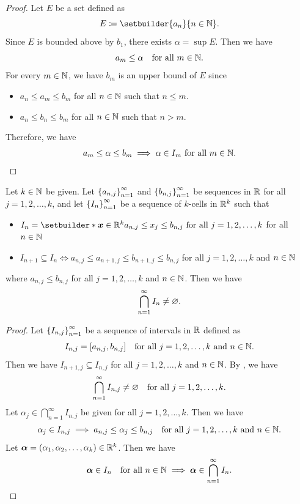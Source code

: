 \begin{proof}
    Let $E$ be a set defined as
    \[
    E \coloneqq \setbuilder{a_{n}}{n \in \N}.
    \]
    Since $E$ is bounded above by $b_{1}$, there exists $\alpha = \sup E$. Then we have
    \[
    a_{m} \leq \alpha \quad \text{for all } m \in \N.
    \]
    For every $m \in \N$, we have $b_{m}$ is an upper bound of $E$ since
    \begin{itemize}
        \item $a_{n} \leq a_{m} \leq b_{m}$ for all $n \in \N$ such that $n \leq m$.
        \item $a_{n} \leq b_{n} \leq b_{m}$ for all $n \in \N$ such that $n > m$.
    \end{itemize}
    Therefore, we have
    \[
    a_{m} \leq \alpha \leq b_{m} \implies \alpha \in I_{m} \text{ for all } m \in \N.
    \]
\end{proof}

\bigskip

\begin{theorem} \label{an:thm:nested-k-cells}
    Let $k \in \N$ be given. Let $\set*{a_{n, j}}_{n = 1}^{\infty}$ and $\set*{b_{n, j}}_{n = 1}^{\infty}$ be sequences
    in $\R$ for all $j = 1, 2, \dots, k$, and let $\set*{I_{n}}_{n = 1}^{\infty}$ be a sequence of $k$-cells in $\R^{k}$
    such that
    \begin{itemize}
        \item $I_{n} = \setbuilder*{\bm{x} \in \R^{k}}{a_{n, j} \leq x_{j} \leq b_{n, j}
        \text{ for all } j = 1, 2, \dots, k}$ for all $n \in \N$
        \item $I_{n + 1} \subseteq I_{n} \iff a_{n, j} \leq a_{n + 1, j} \leq b_{n + 1, j} \leq b_{n, j}$
        for all $j = 1, 2, \dots, k$ and $n \in \N$
    \end{itemize}
    where $a_{n, j} \leq b_{n, j}$ for all $j = 1, 2, \dots, k$ and $n \in \N$. Then we have
    \[
    \bigcap_{n = 1}^{\infty} I_{n} \neq \vnot.
    \]
\end{theorem}

\begin{proof}
    Let $\set*{I_{n, j}}_{n = 1}^{\infty}$ be a sequence of intervals in $\R$ defined as
    \[
    I_{n, j} = [a_{n, j}, b_{n, j}] \quad \text{for all } j = 1, 2, \dots, k \text{ and } n \in \N.
    \]
    Then we have $I_{n + 1, j} \subseteq I_{n, j}$ for all $j = 1, 2, \dots, k$
    and $n \in \N$. By , we have
    \[
    \bigcap_{n = 1}^{\infty} I_{n, j} \neq \vnot \quad \text{for all } j = 1, 2, \dots, k.
    \]
    Let $\alpha_{j} \in \bigcap_{n = 1}^{\infty} I_{n, j}$ be given for all $j = 1, 2, \dots, k$. Then we have
    \[
    \alpha_{j} \in I_{n, j} \implies a_{n, j} \leq \alpha_{j} \leq b_{n, j} \quad \text{for all }
    j = 1, 2, \dots, k \text{ and } n \in \N.
    \]
    Let $\bm{\alpha} = (\alpha_{1}, \alpha_{2}, \dots, \alpha_{k}) \in \R^{k}$. Then we have
    \[
    \bm{\alpha} \in I_{n} \quad \text{for all } n \in \N \implies \bm{\alpha} \in \bigcap_{n = 1}^{\infty} I_{n}.
    \]
\end{proof}

